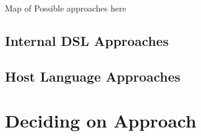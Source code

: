 	Map of Possible approaches here

	\subsection{Internal DSL Approaches} %
	\label{ssub:internal_dsl_approaches}
	

	\subsection{Host Language Approaches} %
	\label{sub:host_language_approaches}
	


\section{Deciding on Approach} %
\label{sec:deciding_on_approach}

